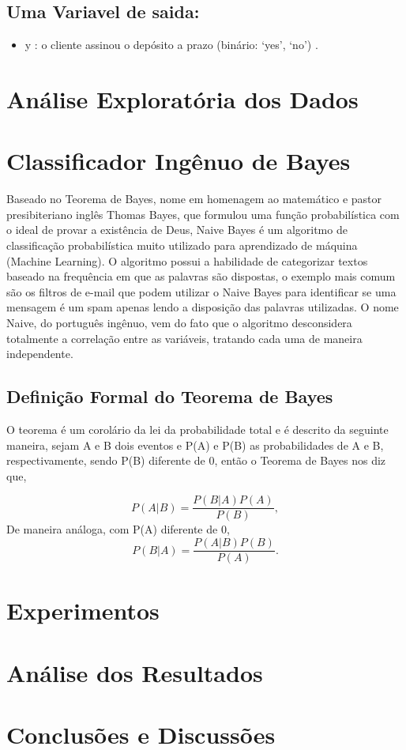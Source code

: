 \documentclass[conference]{IEEEtran}
\begin{document}
\subsection{Uma Variavel de saida:}
\begin{itemize}
    \item y : o cliente assinou o depósito a prazo (binário: ‘yes’, ‘no’) .
\end{itemize}


\section{Análise Exploratória dos Dados}

\section{Classificador Ingênuo de Bayes}
Baseado no Teorema de Bayes, nome em homenagem ao matemático e pastor presibiteriano inglês Thomas Bayes, que formulou uma função probabilística com o ideal de provar a existência de Deus, Naive Bayes é um algoritmo de classificação probabilística muito utilizado para aprendizado de máquina (Machine Learning). O algoritmo possui a habilidade de categorizar textos baseado na frequência em que as palavras são dispostas, o exemplo mais comum são os filtros de e-mail que podem utilizar o Naive Bayes para identificar se uma mensagem é um spam apenas lendo a disposição das palavras utilizadas. O nome Naive, do português ingênuo, vem do fato que o algoritmo desconsidera totalmente a correlação entre as variáveis, tratando cada uma de maneira independente.

\subsection{Definição Formal do Teorema de Bayes}
O teorema é um corolário da lei da probabilidade total e é descrito da seguinte maneira, sejam A e B dois eventos e P(A) e P(B) as probabilidades de A e B, respectivamente, sendo P(B) diferente de 0, então o Teorema de Bayes nos diz que,

\begin{equation}
    P(A|B) = \frac{P(B|A)P(A)}{P(B)},
\end{equation} 
De maneira análoga, com P(A) diferente de 0,  
\begin{equation}
   P(B|A) = \frac{P(A|B)P(B)}{P(A)}.
\end{equation} 

\section{Experimentos}

\section{Análise dos Resultados}

\section{Conclusões e Discussões}





\nocite{*}

\end{document}
